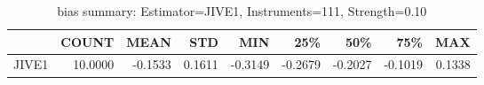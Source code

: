 \begin{table}[ht]
\centering
\caption{bias summary: Estimator=JIVE1, Instruments=111, Strength=0.10}
\begin{tabular}{lrrrrrrrr}
\toprule
 & COUNT & MEAN & STD & MIN & 25\% & 50\% & 75\% & MAX \\
\midrule
JIVE1 & 10.0000 & -0.1533 & 0.1611 & -0.3149 & -0.2679 & -0.2027 & -0.1019 & 0.1338 \\
\bottomrule
\end{tabular}
\end{table}
